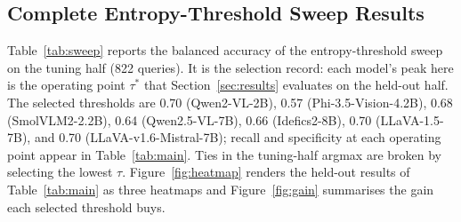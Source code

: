 \documentclass[pdflatex,sn-basic,Numbered]{sn-jnl}
\theoremstyle{thmstyleone}
\theoremstyle{thmstyletwo}
\theoremstyle{thmstylethree}
\begin{document}
\clearpage

\begin{appendices}
\renewcommand{\theHtable}{\thesection.\arabic{table}}

\section{Complete Entropy-Threshold Sweep Results}\label{app:sweep}

Table~\ref{tab:sweep} reports the balanced accuracy of the entropy-threshold sweep on the tuning half (822 queries). It is the selection record: each model's peak here is the operating point $\tau^{*}$ that Section~\ref{sec:results} evaluates on the held-out half. The selected thresholds are 0.70 (Qwen2-VL-2B), 0.57 (Phi-3.5-Vision-4.2B), 0.68 (SmolVLM2-2.2B), 0.64 (Qwen2.5-VL-7B), 0.66 (Idefics2-8B), 0.70 (LLaVA-1.5-7B), and 0.70 (LLaVA-v1.6-Mistral-7B); recall and specificity at each operating point appear in Table~\ref{tab:main}. Ties in the tuning-half argmax are broken by selecting the lowest $\tau$. Figure~\ref{fig:heatmap} renders the held-out results of Table~\ref{tab:main} as three heatmaps and Figure~\ref{fig:gain} summarises the gain each selected threshold buys.


\end{appendices}
\end{document}
